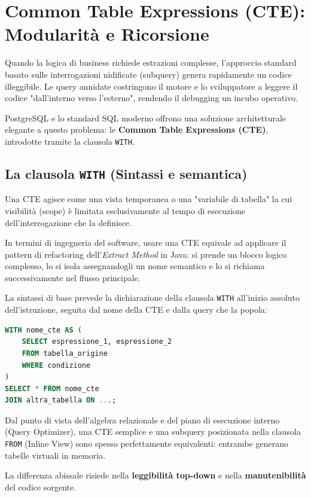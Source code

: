 \section{Common Table Expressions (CTE): Modularità e Ricorsione}

Quando la logica di business richiede estrazioni complesse, l'approccio standard basato sulle interrogazioni nidificate (subquery) genera rapidamente un codice illeggibile. Le query annidate costringono il motore e lo sviluppatore a leggere il codice "dall'interno verso l'esterno", rendendo il debugging un incubo operativo. 

PostgreSQL e lo standard SQL moderno offrono una soluzione architetturale elegante a questo problema: le \textbf{Common Table Expressions (CTE)}, introdotte tramite la clausola \texttt{WITH}.

\subsection{La clausola \texttt{WITH} (Sintassi e semantica)}
Una CTE agisce come una vista temporanea o una "variabile di tabella" la cui visibilità (scope) è limitata esclusivamente al tempo di esecuzione dell'interrogazione che la definisce. 

In termini di ingegneria del software, usare una CTE equivale ad applicare il pattern di refactoring dell'\textit{Extract Method} in Java: si prende un blocco logico complesso, lo si isola assegnandogli un nome semantico e lo si richiama successivamente nel flusso principale.

La sintassi di base prevede la dichiarazione della clausola \texttt{WITH} all'inizio assoluto dell'istruzione, seguita dal nome della CTE e dalla query che la popola:

\begin{lstlisting}[language=SQL, basicstyle=\ttfamily\small, keywordstyle=\color{blue}\bfseries]
WITH nome_cte AS (
    SELECT espressione_1, espressione_2
    FROM tabella_origine
    WHERE condizione
)
SELECT * FROM nome_cte 
JOIN altra_tabella ON ...;
\end{lstlisting}

Dal punto di vista dell'algebra relazionale e del piano di esecuzione interno (Query Optimizer), una CTE semplice e una subquery posizionata nella clausola \texttt{FROM} (Inline View) sono spesso perfettamente equivalenti: entrambe generano tabelle virtuali in memoria. 

La differenza abissale risiede nella \textbf{leggibilità top-down} e nella \textbf{manutenibilità} del codice sorgente.

